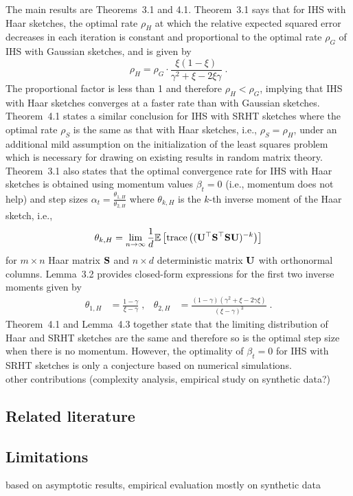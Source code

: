 The main results are Theorems~3.1 and 4.1. Theorem~3.1 says that for IHS with Haar sketches, the optimal rate $\rho_H$ at which the relative expected squared error decreases in each iteration is constant and proportional to the optimal rate $\rho_G$ of IHS with Gaussian sketches, and is given by
\[
\rho_H = \rho_G\cdot\frac{\xi(1-\xi)}{\gamma^2+\xi-2\xi\gamma} \;.
\]
The proportional factor is less than 1 and therefore $\rho_H<\rho_G$, implying that IHS with Haar sketches converges at a faster rate than with Gaussian sketches.  Theorem~4.1 states a similar conclusion for IHS with SRHT sketches where the optimal rate $\rho_S$ is the same as that with Haar sketches, i.e., $\rho_S=\rho_H$, under an additional mild assumption on the initialization of the least squares problem which is necessary for drawing on existing results in random matrix theory. Theorem~3.1 also states that the optimal convergence rate for IHS with Haar sketches is obtained using momentum values $\beta_t=0$ (i.e., momentum does not help) and step sizes $\alpha_t = \frac{\theta_{1,H}}{\theta_{2,H}}$ where $\theta_{k,H}$ is the $k$-th inverse moment of the Haar sketch, i.e.,
\[
\theta_{k,H} = \lim_{n\rightarrow\infty}\frac{1}{d}\mathbb{E}\left[\mathrm{trace}\left((\mathbf{U}^\top\mathbf{S}^\top\mathbf{S}\mathbf{U})^{-k}\right)\right]
\]
for $m\times n$ Haar matrix $\mathbf{S}$ and $n\times d$ deterministic matrix $\mathbf{U}$ with orthonormal columns. Lemma~3.2 provides closed-form expressions for the first two inverse moments given by
\begin{align*}
\theta_{1,H} &= \frac{1-\gamma}{\xi-\gamma} \;, & \theta_{2,H} &= \frac{(1-\gamma)(\gamma^2+\xi-2\gamma\xi)}{(\xi-\gamma)^3} \;.
\end{align*}
Theorem~4.1 and Lemma~4.3 together state that the limiting distribution of Haar and SRHT sketches are the same and therefore so is the optimal step size when there is no momentum. However, the optimality of $\beta_t=0$ for IHS with SRHT sketches is only a conjecture based on numerical simulations.
\\

\todo other contributions (complexity analysis, empirical study on synthetic data?)

\subsection{Related literature}

\subsection{Limitations}

\todo based on asymptotic results, empirical evaluation mostly on synthetic data